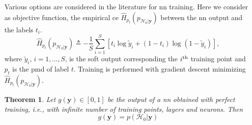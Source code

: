 \documentclass[conference,draftcls,onecolumn]{IEEEtran}
\newcommand{\hatcross}[2]{\hat{H}_{#1}(#2)}
\newcommand{\gy}{g(\bm y)}
\newtheorem{theorem}{Theorem}
\begin{document}
Various options are considered in the literature for \ac{nn} training. Here we consider as objective function, the empirical \ac{ce} $\hatcross{p_t}{p_{\mathcal{H}_0|\bm y}}$ between the \ac{nn} output and the labels $t_i$. 
\begin{equation}\label{eq:ce}
\hatcross{p_t}{p_{\mathcal{H}_0|\bm y}} \triangleq -\frac{1}{S} \sum_{i=1}^{S}\left[t_i\log \tilde{y}_i +\left(1-t_i\right)\log\left(1-\tilde{y}_i\right)\right],
\end{equation}
where $\tilde{y}_i$, $i=1, \ldots, S$, is the soft output corresponding the $i^{\rm th}$  training point and $p_t$ is the \ac{pmd} of label $t$. Training is performed with gradient descent minimizing $\hatcross{p_t}{p_{\mathcal{H}_0|\bm y}}$.
\begin{theorem}
Let $\gy \in [0,1]$ be the output of a \ac{nn} obtained with perfect training, i.e., with infinite number of training points, layers and neurons. Then 
\begin{equation}
	\gy = p(\mathcal{H}_0|\bm y)	
\end{equation}
\end{theorem}
\end{document}
